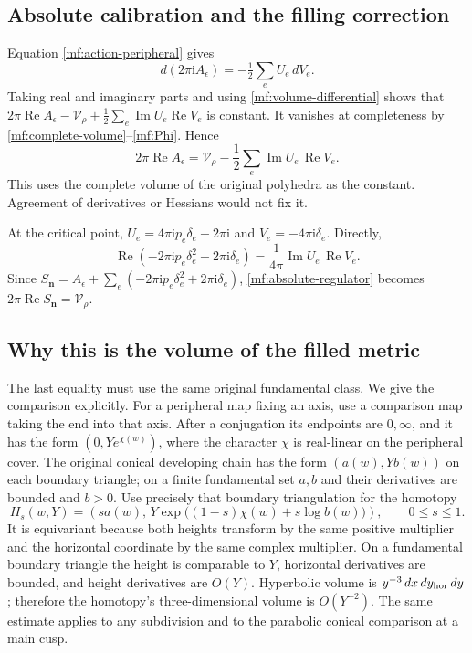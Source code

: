 \documentclass[11pt]{article}
\numberwithin{equation}{section}
\theoremstyle{definition}
\theoremstyle{remark}
\newcommand{\ii}{\mathrm i}
\newcommand{\Rea}{\operatorname{Re}}
\newcommand{\Ima}{\operatorname{Im}}
\begin{document}
\subsection{Absolute calibration and the filling correction}

Equation \eqref{mf:action-peripheral} gives
\[
                d(2\pi\ii A_\epsilon)=-\tfrac12\sum_eU_e\,dV_e.
\]
Taking real and imaginary parts and using
\eqref{mf:volume-differential} shows that
\(2\pi\Rea A_\epsilon-\mathcal V_\rho
                       +\frac12\sum_e\Ima U_e\Rea V_e\)
is constant. It vanishes at completeness by
\eqref{mf:complete-volume}--\eqref{mf:Phi}. Hence
\begin{equation}\label{mf:absolute-regulator}
 2\pi\Rea A_\epsilon
       =\mathcal V_\rho-\frac12\sum_e\Ima U_e\,\Rea V_e.
\end{equation}
This uses the complete volume of the original polyhedra as the
constant. Agreement of derivatives or Hessians would not fix it.

At the critical point,
\(U_e=4\pi\ii p_e\delta_e-2\pi\ii\) and
\(V_e=-4\pi\ii\delta_e\). Directly,
\begin{equation}\label{mf:boundary-cancel}
 \Rea(-2\pi\ii p_e\delta_e^2+2\pi\ii\delta_e)
     =\frac1{4\pi}\Ima U_e\,\Rea V_e .
\end{equation}
Since \(S_{\mathbf n}=A_\epsilon+
\sum_e(-2\pi\ii p_e\delta_e^2+2\pi\ii\delta_e)\),
\eqref{mf:absolute-regulator} becomes \(2\pi\Rea S_{\mathbf n}
=\mathcal V_\rho\).

\subsection{Why this is the volume of the filled metric}

The last equality must use the same original fundamental class.
We give the comparison explicitly. For a peripheral map fixing an
axis, use a comparison map taking the end into that axis. After a
conjugation its endpoints are \(0,\infty\), and it has the form
\((0,Y e^{\chi(w)})\), where the character \(\chi\) is real-linear
on the peripheral cover. The original conical developing chain has
the form
\((a(w),Yb(w))\) on each boundary triangle; on a finite fundamental
set \(a,b\) and their derivatives are bounded and \(b>0\).
Use precisely that boundary triangulation for the homotopy
\begin{equation}\label{mf:boundary-homotopy}
 H_s(w,Y)=
 \left(sa(w),\,
       Y\exp\bigl((1-s)\chi(w)+s\log b(w)\bigr)\right),
 \qquad 0\le s\le1 .
\end{equation}
It is equivariant because both heights transform by the same positive
multiplier and the horizontal coordinate by the same complex
multiplier. On a fundamental boundary triangle the height is comparable
to \(Y\), horizontal derivatives are bounded, and height derivatives
are \(O(Y)\). Hyperbolic volume is \(y^{-3}\,dx\,dy_{\rm hor}\,dy\);
therefore the homotopy's three-dimensional volume is \(O(Y^{-2})\).
The same estimate applies to any subdivision and to the parabolic
conical comparison at a main cusp.
\end{document}
